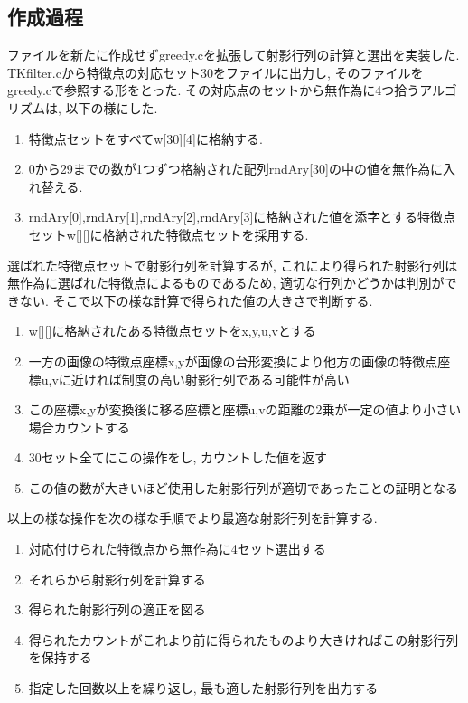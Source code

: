 \documentclass[a4j]{jarticle}
\begin{document}
\subsection{作成過程}
ファイルを新たに作成せずgreedy.cを拡張して射影行列の計算と選出を実装した. 
TKfilter.cから特徴点の対応セット30をファイルに出力し, そのファイルをgreedy.cで参照する形をとった. 
その対応点のセットから無作為に4つ拾うアルゴリズムは, 以下の様にした. 
\begin{enumerate}
\item 特徴点セットをすべてw[30][4]に格納する.
\item 0から29までの数が1つずつ格納された配列rndAry[30]の中の値を無作為に入れ替える. 
\item rndAry[0],rndAry[1],rndAry[2],rndAry[3]に格納された値を添字とする特徴点セットw[][]に格納された特徴点セットを採用する.
\end{enumerate}

選ばれた特徴点セットで射影行列を計算するが, これにより得られた射影行列は無作為に選ばれた特徴点によるものであるため, 適切な行列かどうかは判別ができない. そこで以下の様な計算で得られた値の大きさで判断する. 

\begin{enumerate}
\item w[][]に格納されたある特徴点セットをx,y,u,vとする
\item 一方の画像の特徴点座標x,yが画像の台形変換により他方の画像の特徴点座標u,vに近ければ制度の高い射影行列である可能性が高い
\item この座標x,yが変換後に移る座標と座標u,vの距離の2乗が一定の値より小さい場合カウントする
\item 30セット全てにこの操作をし, カウントした値を返す
\item この値の数が大きいほど使用した射影行列が適切であったことの証明となる
\end{enumerate}

以上の様な操作を次の様な手順でより最適な射影行列を計算する.

\begin{enumerate}
\item 対応付けられた特徴点から無作為に4セット選出する
\item それらから射影行列を計算する
\item 得られた射影行列の適正を図る
\item 得られたカウントがこれより前に得られたものより大きければこの射影行列を保持する
\item 指定した回数以上を繰り返し, 最も適した射影行列を出力する
\end{enumerate}
\end{document}
